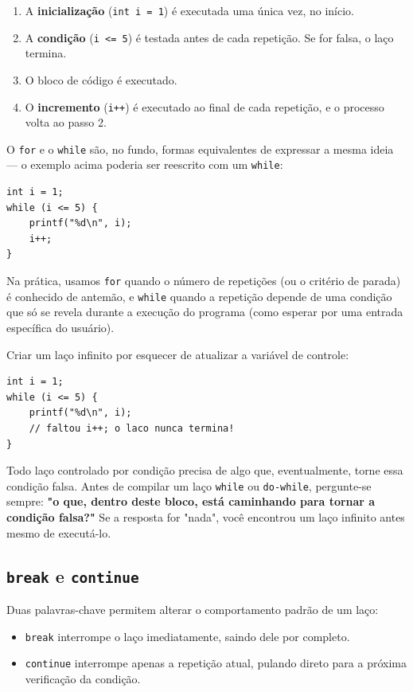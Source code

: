 \documentclass[12pt,a4paper,oneside]{extreport}
\begin{document}
\begin{enumerate}
    \item A \textbf{inicialização} (\texttt{int i = 1}) é executada uma única vez, no início.
    \item A \textbf{condição} (\texttt{i <= 5}) é testada antes de cada repetição. Se for falsa, o laço termina.
    \item O bloco de código é executado.
    \item O \textbf{incremento} (\texttt{i++}) é executado ao final de cada repetição, e o processo volta ao passo 2.
\end{enumerate}

O \texttt{for} e o \texttt{while} são, no fundo, formas equivalentes de expressar a mesma ideia — o exemplo acima poderia ser reescrito com um \texttt{while}:

\begin{lstlisting}
int i = 1;
while (i <= 5) {
    printf("%d\n", i);
    i++;
}
\end{lstlisting}

Na prática, usamos \texttt{for} quando o número de repetições (ou o critério de parada) é conhecido de antemão, e \texttt{while} quando a repetição depende de uma condição que só se revela durante a execução do programa (como esperar por uma entrada específica do usuário).

\begin{errocomum}
Criar um laço infinito por esquecer de atualizar a variável de controle:
\begin{lstlisting}
int i = 1;
while (i <= 5) {
    printf("%d\n", i);
    // faltou i++; o laco nunca termina!
}
\end{lstlisting}
Todo laço controlado por condição precisa de algo que, eventualmente, torne essa condição falsa. Antes de compilar um laço \texttt{while} ou \texttt{do-while}, pergunte-se sempre: \textbf{"o que, dentro deste bloco, está caminhando para tornar a condição falsa?"} Se a resposta for "nada", você encontrou um laço infinito antes mesmo de executá-lo.
\end{errocomum}

\subsection{\texttt{break} e \texttt{continue}}

Duas palavras-chave permitem alterar o comportamento padrão de um laço:

\begin{itemize}
    \item \texttt{break} interrompe o laço imediatamente, saindo dele por completo.
    \item \texttt{continue} interrompe apenas a repetição atual, pulando direto para a próxima verificação da condição.
\end{itemize}
\end{document}
